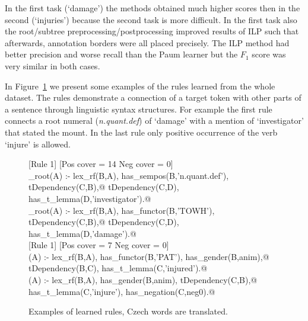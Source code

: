 \documentclass[runningheads,a4paper]{llncs}
\begin{document}
In the first task (`damage') the methods obtained much higher scores then in the second (`injuries') because the second task is more difficult. In the first task also the root/subtree preprocessing/postprocessing improved results of ILP such that afterwards, annotation borders were all placed precisely. The ILP method had better precision and worse recall than the Paum learner but the $F_1$ score was very similar in both cases.


In Figure~\ref{fig:rules} we present some examples of the rules learned from the whole dataset. The rules demonstrate a connection of a target token with other parts of a sentence through linguistic syntax structures. For example the first rule connects a root numeral (\emph{n.quant.def}) of `damage' with a mention of `investigator' that stated the mount. In the last rule only positive occurrence of the verb `injure' is allowed.

\begin{figure}
	\scriptsize
[Rule 1] [Pos cover = 14 Neg cover = 0]\\
\verb@damage_root(A) :- lex_rf(B,A), has_sempos(B,'n.quant.def'), tDependency(C,B),@
\verb@   tDependency(C,D), has_t_lemma(D,'investigator').@ %
\smallskip\newline
[Rule 2] [Pos cover = 13 Neg cover = 0]\\
\verb@damage_root(A) :- lex_rf(B,A), has_functor(B,'TOWH'), tDependency(C,B),@
\verb@   tDependency(C,D), has_t_lemma(D,'damage').@\\


[Rule 1] [Pos cover = 7 Neg cover = 0]\\
\verb@injuries(A) :- lex_rf(B,A), has_functor(B,'PAT'), has_gender(B,anim),@
\verb@   tDependency(B,C), has_t_lemma(C,'injured').@
\smallskip\newline
[Rule 8] [Pos cover = 6 Neg cover = 0]\\
\verb@injuries(A) :- lex_rf(B,A), has_gender(B,anim), tDependency(C,B),@
\verb@   has_t_lemma(C,'injure'), has_negation(C,neg0).@
	\caption{Examples of learned rules, Czech words are translated.}
	\label{fig:rules}
\end{figure}
\end{document}
